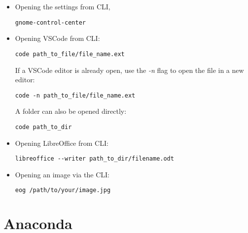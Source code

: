 \documentclass[12pt, a4paper]{article}
\numberwithin{equation}{section}
\theoremstyle{definition}
\theoremstyle{definition}
\begin{document}
	\begin{itemize}
		\item Opening the settings from CLI, 
		
		\begin{lstlisting}[style=mystylebash, label=alg:cli_settings, xleftmargin=\parindent]
			gnome-control-center
		\end{lstlisting}
	
		\item Opening VSCode from CLI: 
		
		\begin{lstlisting}[style=mystylebash, label=alg:ubuntu__vscode_file, xleftmargin=\parindent]
			code path_to_file/file_name.ext
		\end{lstlisting}
		
		If a VSCode editor is already open, use the \textit{-n} flag to open the file in a new editor:
		
		\begin{lstlisting}[style=mystylebash, label=alg:ubuntu__vscode_file_new_editor, xleftmargin=\parindent]
			code -n path_to_file/file_name.ext
		\end{lstlisting}
		
		A folder can also be opened directly:
		\begin{lstlisting}[style=mystylebash, label=alg:ubuntu__vscode_dir, caption=Opening VSCode dir from CLI, xleftmargin=\parindent]
			code path_to_dir
		\end{lstlisting}
		
		\item Opening LibreOffice from CLI:
		
		\begin{lstlisting}[style=mystylebash, label=alg:ubuntu__libre_office, xleftmargin=\parindent]
			libreoffice --writer path_to_dir/filename.odt
		\end{lstlisting}
		
		\item Opening an image via the CLI: 
		
		\begin{lstlisting}[style=mystylebash, label=alg:ubuntu_eog, xleftmargin=\parindent]
			eog /path/to/your/image.jpg
		\end{lstlisting}
	
	\end{itemize}
	
	\newpage 
	
	\section{Anaconda}
	
\end{document}

